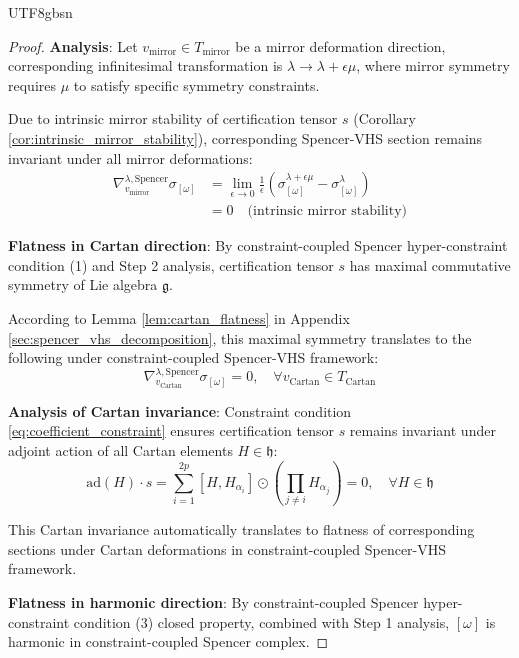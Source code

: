 \documentclass[a4paper,12pt]{extarticle}
\theoremstyle{definition}
\begin{document}
\begin{CJK}{UTF8}{gbsn}
\begin{proof}
\textbf{Analysis}: Let $v_{\text{mirror}} \in T_{\text{mirror}}$ be a mirror deformation direction, corresponding infinitesimal transformation is $\lambda \to \lambda + \epsilon \mu$, where mirror symmetry requires $\mu$ to satisfy specific symmetry constraints.

Due to intrinsic mirror stability of certification tensor $s$ (Corollary \ref{cor:intrinsic_mirror_stability}), corresponding Spencer-VHS section remains invariant under all mirror deformations:
\begin{align}
\nabla^{\lambda,\text{Spencer}}_{v_{\text{mirror}}} \sigma_{[\omega]} &= \lim_{\epsilon \to 0} \frac{1}{\epsilon}\left(\sigma_{[\omega]}^{\lambda+\epsilon\mu} - \sigma_{[\omega]}^{\lambda}\right) \label{eq:mirror_gauss_manin_1}\\
&= 0 \quad \text{(intrinsic mirror stability)}\label{eq:mirror_gauss_manin_2}
\end{align}

\textbf{Flatness in Cartan direction}:
By constraint-coupled Spencer hyper-constraint condition (1) and Step 2 analysis, certification tensor $s$ has maximal commutative symmetry of Lie algebra $\mathfrak{g}$.

According to Lemma \ref{lem:cartan_flatness} in Appendix \ref{sec:spencer_vhs_decomposition}, this maximal symmetry translates to the following under constraint-coupled Spencer-VHS framework:
\begin{equation}
\label{eq:cartan_direction_flatness}
\nabla^{\lambda,\text{Spencer}}_{v_{\text{Cartan}}} \sigma_{[\omega]} = 0, \quad \forall v_{\text{Cartan}} \in T_{\text{Cartan}}
\end{equation}

\textbf{Analysis of Cartan invariance}: Constraint condition \eqref{eq:coefficient_constraint} ensures certification tensor $s$ remains invariant under adjoint action of all Cartan elements $H \in \mathfrak{h}$:
\begin{equation}
\label{eq:cartan_invariance}
\text{ad}(H) \cdot s = \sum_{i=1}^{2p} [H, H_{\alpha_i}] \odot (\prod_{j \neq i} H_{\alpha_j}) = 0, \quad \forall H \in \mathfrak{h}
\end{equation}

This Cartan invariance automatically translates to flatness of corresponding sections under Cartan deformations in constraint-coupled Spencer-VHS framework.

\textbf{Flatness in harmonic direction}:
By constraint-coupled Spencer hyper-constraint condition (3) closed property, combined with Step 1 analysis, $[\omega]$ is harmonic in constraint-coupled Spencer complex.


\end{proof}
\end{CJK}
\end{document}
